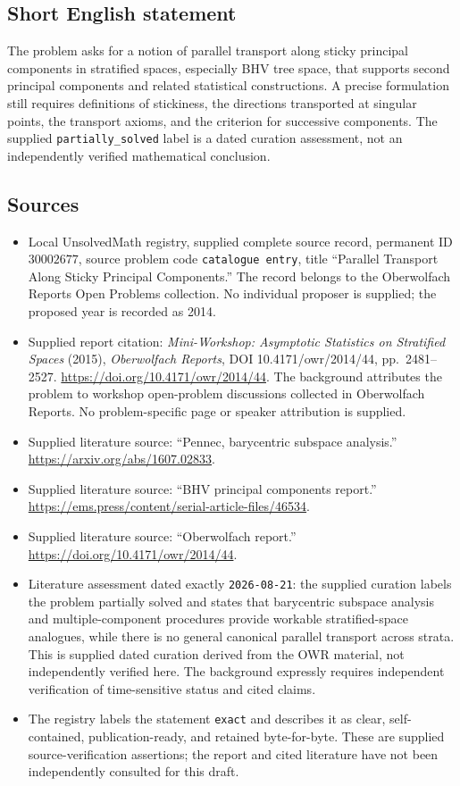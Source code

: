 \documentclass[11pt]{article}
\begin{document}
\subsection{Short English statement}
The problem asks for a notion of parallel transport along sticky principal components in stratified spaces, especially BHV tree space, that supports second principal components and related statistical constructions. A precise formulation still requires definitions of stickiness, the directions transported at singular points, the transport axioms, and the criterion for successive components. The supplied \texttt{partially\_solved} label is a dated curation assessment, not an independently verified mathematical conclusion.
\subsection{Sources}
\begin{itemize}
\item Local UnsolvedMath registry, supplied complete source record, permanent ID \(30002677\), source problem code \texttt{catalogue entry}, title ``Parallel Transport Along Sticky Principal Components.'' The record belongs to the Oberwolfach Reports Open Problems collection. No individual proposer is supplied; the proposed year is recorded as 2014.
\item Supplied report citation: \emph{Mini-Workshop: Asymptotic Statistics on Stratified Spaces} (2015), \emph{Oberwolfach Reports}, DOI 10.4171/owr/2014/44, pp.\ 2481--2527. \url{https://doi.org/10.4171/owr/2014/44}. The background attributes the problem to workshop open-problem discussions collected in Oberwolfach Reports. No problem-specific page or speaker attribution is supplied.
\item Supplied literature source: ``Pennec, barycentric subspace analysis.'' \url{https://arxiv.org/abs/1607.02833}.
\item Supplied literature source: ``BHV principal components report.'' \url{https://ems.press/content/serial-article-files/46534}.
\item Supplied literature source: ``Oberwolfach report.'' \url{https://doi.org/10.4171/owr/2014/44}.
\item Literature assessment dated exactly \texttt{2026-08-21}: the supplied curation labels the problem partially solved and states that barycentric subspace analysis and multiple-component procedures provide workable stratified-space analogues, while there is no general canonical parallel transport across strata. This is supplied dated curation derived from the OWR material, not independently verified here. The background expressly requires independent verification of time-sensitive status and cited claims.
\item The registry labels the statement \texttt{exact} and describes it as clear, self-contained, publication-ready, and retained byte-for-byte. These are supplied source-verification assertions; the report and cited literature have not been independently consulted for this draft.
\end{itemize}
\end{document}

